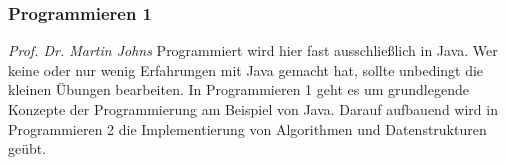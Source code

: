 
\subsubsection{Programmieren 1}
	\textit{Prof. Dr. Martin Johns}
	Programmiert wird hier fast ausschließlich in Java. Wer keine oder nur wenig Erfahrungen mit Java gemacht hat, sollte unbedingt die kleinen Übungen bearbeiten.
	In Programmieren 1 geht es um grundlegende Konzepte der Programmierung am Beispiel von Java. Darauf aufbauend wird in Programmieren 2 die Implementierung von Algorithmen und Datenstrukturen geübt. 